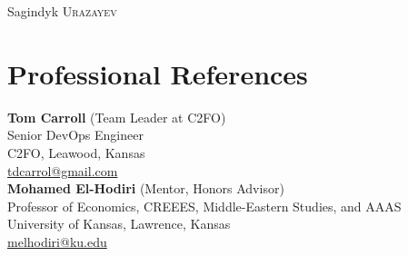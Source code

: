 \documentclass[a4paper,10pt]{article}
\begin{document}
\pagestyle{empty} %

\par{\centering
		{\Huge Sagindyk \textsc{Urazayev}
	}\bigskip\par}


\section{Professional References}

\textbf{Tom Carroll} (Team Leader at C2FO)\\
Senior DevOps Engineer\\
C2FO, Leawood, Kansas\\
\href{mailto:tdcarrol@gmail.com}{tdcarrol@gmail.com}\\

\textbf{Mohamed El-Hodiri} (Mentor, Honors Advisor)\\
Professor of Economics, CREEES, Middle-Eastern Studies, and AAAS\\
University of Kansas, Lawrence, Kansas\\
\href{mailto:melhodiri@ku.edu}{melhodiri@ku.edu}\\




\end{document}
